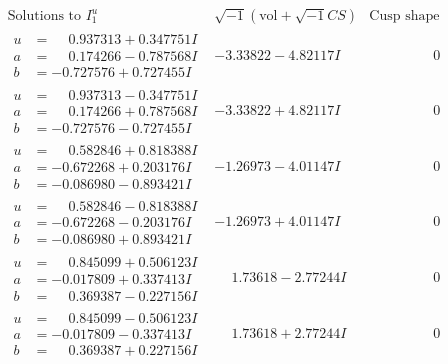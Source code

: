 \documentclass[1p]{elsarticle_modified}
\theoremstyle{definition}
\newcommand{\I}{\sqrt{-1}}
\begin{document}
$$\begin{array}{c|c|c}  
\text{Solutions to }I^u_{1}& \I (\text{vol} + \sqrt{-1}CS) & \text{Cusp shape}\\
 \hline 
\begin{aligned}
u &= \phantom{-}0.937313 + 0.347751 I \\
a &= \phantom{-}0.174266 - 0.787568 I \\
b &= -0.727576 + 0.727455 I\end{aligned}
 & -3.33822 - 4.82117 I & \phantom{-0.000000 } 0 \\ \hline\begin{aligned}
u &= \phantom{-}0.937313 - 0.347751 I \\
a &= \phantom{-}0.174266 + 0.787568 I \\
b &= -0.727576 - 0.727455 I\end{aligned}
 & -3.33822 + 4.82117 I & \phantom{-0.000000 } 0 \\ \hline\begin{aligned}
u &= \phantom{-}0.582846 + 0.818388 I \\
a &= -0.672268 + 0.203176 I \\
b &= -0.086980 - 0.893421 I\end{aligned}
 & -1.26973 - 4.01147 I & \phantom{-0.000000 } 0 \\ \hline\begin{aligned}
u &= \phantom{-}0.582846 - 0.818388 I \\
a &= -0.672268 - 0.203176 I \\
b &= -0.086980 + 0.893421 I\end{aligned}
 & -1.26973 + 4.01147 I & \phantom{-0.000000 } 0 \\ \hline\begin{aligned}
u &= \phantom{-}0.845099 + 0.506123 I \\
a &= -0.017809 + 0.337413 I \\
b &= \phantom{-}0.369387 - 0.227156 I\end{aligned}
 & \phantom{-}1.73618 - 2.77244 I & \phantom{-0.000000 } 0 \\ \hline\begin{aligned}
u &= \phantom{-}0.845099 - 0.506123 I \\
a &= -0.017809 - 0.337413 I \\
b &= \phantom{-}0.369387 + 0.227156 I\end{aligned}
 & \phantom{-}1.73618 + 2.77244 I & \phantom{-0.000000 } 0 \\ \hline\begin{aligned}

\end{aligned}
\end{array}$$
\end{document}
